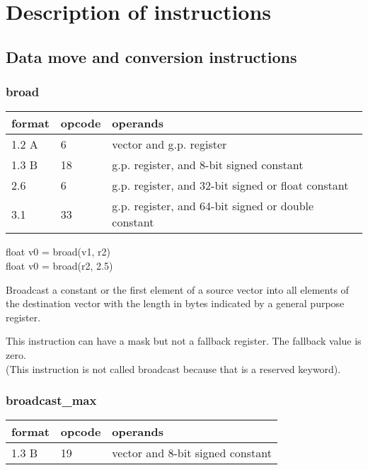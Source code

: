 \documentclass[forwardcom.tex]{subfiles}
\begin{document}
\RaggedRight

\chapter{Description of instructions}
\label{chap:DescriptionOfInstructions}
\vv

\section{Data move and conversion instructions}
\vv

\subsection{broad}

\label{table:broadInstruction}
\begin{tabular}{|p{12mm}|p{15mm}|p{100mm}|}
\hline
\bfseries format & \bfseries opcode & \bfseries operands \\ \hline
1.2 A &  6 & vector and g.p. register \\ \hline
1.3 B & 18 & g.p. register, and 8-bit signed constant \\ \hline
2.6   &  6 & g.p. register, and 32-bit signed or float constant \\ \hline
3.1   & 33 & g.p. register, and 64-bit signed or double constant \\ \hline
\end{tabular}
\vv

float v0 = broad(v1, r2)\\
float v0 = broad(r2, 2.5)
\vv

Broadcast a constant or the first element of a source vector into all
elements of the destination vector with the length in bytes indicated by a general purpose register.
\vv

This instruction can have a mask but not a fallback register. The fallback value is zero.\\
(This instruction is not called broadcast because that is a reserved keyword).


\subsection{broadcast\_max}

\label{table:broadcastMaxInstruction}
\begin{tabular}{|p{12mm}|p{15mm}|p{100mm}|}
\hline
\bfseries format & \bfseries opcode & \bfseries operands \\ \hline
1.3 B & 19 & vector and 8-bit signed constant \\ \hline
\end{tabular}
\vv
\end{document}
